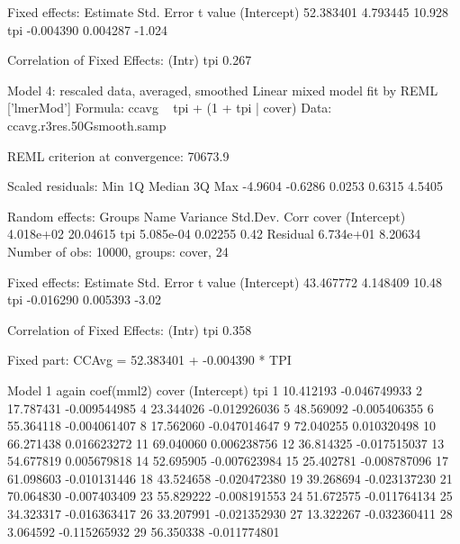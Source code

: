Fixed effects:
             Estimate Std. Error t value
(Intercept) 52.383401   4.793445  10.928
tpi         -0.004390   0.004287  -1.024

Correlation of Fixed Effects:
    (Intr)
tpi 0.267 

Model 4: rescaled data, averaged, smoothed
Linear mixed model fit by REML ['lmerMod']
Formula: ccavg ~ tpi + (1 + tpi | cover)
   Data: ccavg.r3res.50Gsmooth.samp

REML criterion at convergence: 70673.9

Scaled residuals: 
    Min      1Q  Median      3Q     Max 
-4.9604 -0.6286  0.0253  0.6315  4.5405 

Random effects:
 Groups   Name        Variance  Std.Dev. Corr
 cover    (Intercept) 4.018e+02 20.04615     
          tpi         5.085e-04  0.02255 0.42
 Residual             6.734e+01  8.20634     
Number of obs: 10000, groups:  cover, 24

Fixed effects:
             Estimate Std. Error t value
(Intercept) 43.467772   4.148409   10.48
tpi         -0.016290   0.005393   -3.02

Correlation of Fixed Effects:
    (Intr)
tpi 0.358 

Fixed part: CCAvg = 52.383401 + -0.004390 * TPI


Model 1 again
coef(mml2)
cover
   (Intercept)          tpi
1    10.412193 -0.046749933
2    17.787431 -0.009544985
4    23.344026 -0.012926036
5    48.569092 -0.005406355
6    55.364118 -0.004061407
8    17.562060 -0.047014647
9    72.040255  0.010320498
10   66.271438  0.016623272
11   69.040060  0.006238756
12   36.814325 -0.017515037
13   54.677819  0.005679818
14   52.695905 -0.007623984
15   25.402781 -0.008787096
17   61.098603 -0.010131446
18   43.524658 -0.020472380
19   39.268694 -0.023137230
21   70.064830 -0.007403409
23   55.829222 -0.008191553
24   51.672575 -0.011764134
25   34.323317 -0.016363417
26   33.207991 -0.021352930
27   13.322267 -0.032360411
28    3.064592 -0.115265932
29   56.350338 -0.011774801